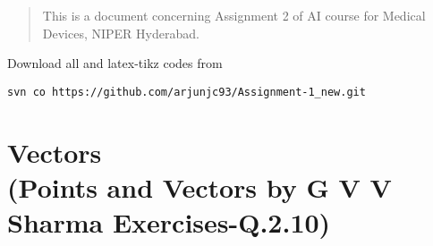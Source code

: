 \documentclass[journal,12pt,twocolumn]{IEEEtran}
\begin{document}
\newpage
\bigskip
\renewcommand{\thefigure}{\theenumi}
\renewcommand{\thetable}{\theenumi}
\begin{abstract}
This is a document concerning Assignment 2 of AI course for Medical Devices, NIPER Hyderabad.
\end{abstract}
%
Download all and latex-tikz codes from 
%
\begin{lstlisting}
svn co https://github.com/arjunjc93/Assignment-1_new.git
\end{lstlisting}
%
\section{Vectors\\(Points and Vectors by G V V Sharma Exercises-Q.2.10)}
\renewcommand{\theequation}{\theenumi}
\end{document}

